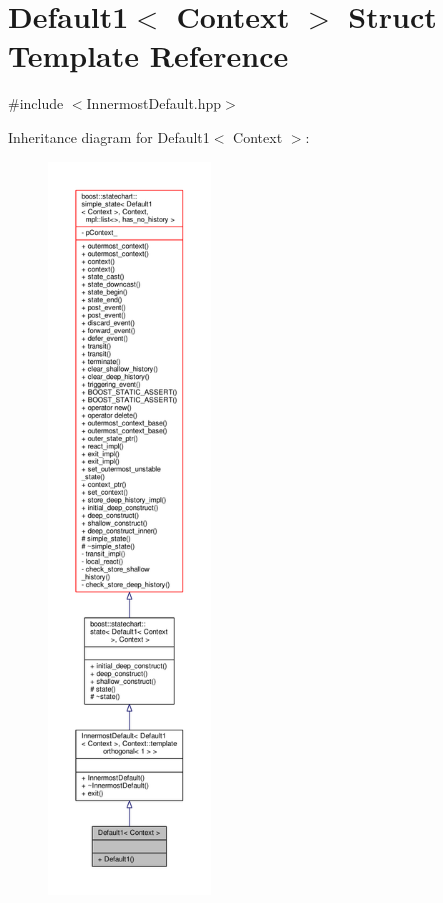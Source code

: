 \hypertarget{struct_default1}{}\section{Default1$<$ Context $>$ Struct Template Reference}
\label{struct_default1}


{\ttfamily \#include $<$Innermost\+Default.\+hpp$>$}



Inheritance diagram for Default1$<$ Context $>$\+:
\nopagebreak
\begin{figure}[H]
\begin{center}
\leavevmode
\includegraphics[height=550pt]{struct_default1__inherit__graph}
\end{center}
\end{figure}


